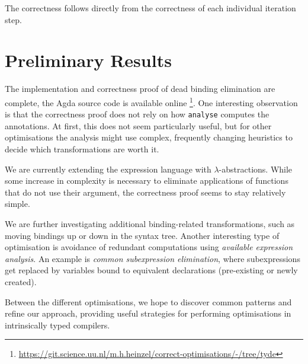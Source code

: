 \documentclass[acmsmall,nonacm,review,timestamp]{acmart}
\newcommand{\I}[1]{\texttt{#1}\xspace}
\begin{document}
The correctness follows directly from the correctness of each individual iteration step.

\section{Preliminary Results}

The implementation and correctness proof of dead binding elimination are complete,
the Agda source code is available online
\footnote{\url{https://git.science.uu.nl/m.h.heinzel/correct-optimisations/-/tree/tyde}}.
One interesting observation is that the correctness proof does not rely on how
\I{analyse} computes the annotations.
At first, this does not seem particularly useful,
but for other optimisations the analysis might use complex, frequently changing heuristics to decide
which transformations are worth it.

We are currently extending the expression language
with $\lambda$-abstractions.
While some increase in complexity is necessary to eliminate applications of functions that do not use their argument,
the correctness proof seems to stay relatively simple.

We are further investigating additional binding-related transformations,
such as moving bindings up or down in the syntax tree.
Another interesting type of optimisation is avoidance of redundant computations
using \emph{available expression analysis}.
An example is \emph{common subexpression elimination},
where subexpressions get replaced by variables bound to equivalent declarations
(pre-existing or newly created).

Between the different optimisations,
we hope to discover common patterns and refine our approach,
providing useful strategies for performing optimisations in intrinsically typed compilers.



{}
\end{document}
